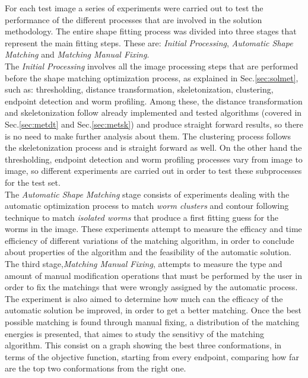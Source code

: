 For each test image a series of experiments were carried out to test the performance of
the different processes that are involved in the solution methodology. The entire 
shape fitting process was divided into three stages that represent the 
main fitting steps. These are: \emph{Initial Processing}, \emph{Automatic Shape Matching} and
\emph{Matching Manual Fixing}.\\

The \emph{Initial Processing} involves all the image processing steps that are performed 
before the shape matching optimization process, as explained in Sec.\ref{sec:solmet},
such as: thresholding, distance transformation, skeletonization, 
clustering, endpoint detection and worm profiling. Among these, the distance transformation
and skeletonization follow already implemented and tested algorithms (covered in Sec.\ref{sec:metdt}
and Sec.\ref{sec:metsk}) and produce straight forward results, so there is no need to make further analysis
about them.
The clustering process follows the skeletonization process and is straight forward as well.
On the other hand the thresholding, endpoint detection and worm profiling processes vary 
from image to image, so different experiments are carried out in order to test these subprocesses
for the test set.\\

The \emph{Automatic Shape Matching} stage consists of experiments dealing with the automatic
optimization process to match \emph{worm clusters} and contour following technique to match 
\emph{isolated worms} that produce a first fitting guess for the worms in the image. These 
experiments attempt to measure the efficacy and time efficiency of different variations of the
matching algorithm, in order to conclude about properties of the algorithm and the feasibility 
of the automatic solution.\\
The third stage,\emph{Matching Manual Fixing}, attempts to measure the type and amount of 
manual modification operations that must be performed by the user in order to fix the 
matchings that were wrongly assigned by the automatic process. The experiment is also 
aimed to determine how much can the efficacy of the automatic solution be improved, in
order to get a better matching. Once the best possible matching is found through manual fixing,
a distribution of the matching energies is presented, that aimes to study the sensitivy of the
matching algorithm. This consist on a graph showing the best three conformations, in terms of the objective
function, starting from every endpoint, comparing how far are the top two conformations from
the right one.\\

